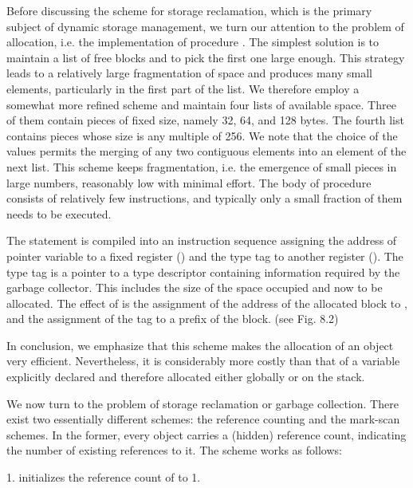 Before discussing the scheme for storage reclamation, which is the primary subject of dynamic storage management, we turn our attention to the problem of allocation, i.e. the implementation of procedure . The simplest solution is to maintain a list of free blocks and to pick the first one large enough. This strategy leads to a relatively large fragmentation of space and produces many small elements, particularly in the first part of the list. We therefore employ a somewhat more refined scheme and maintain four lists of available space. Three of them contain pieces of fixed size, namely 32, 64, and 128 bytes. The fourth list contains pieces whose size is any multiple of 256. We note that the choice of the values permits the merging of any two contiguous elements into an element of the next list. This scheme keeps fragmentation, i.e. the emergence of small pieces in large numbers, reasonably low with minimal effort. The body of procedure  consists of relatively few instructions, and typically only a small fraction of them needs to be executed.

The statement  is compiled into an instruction sequence assigning the address of pointer variable  to a fixed register () and the type tag to another register (). The type tag is a pointer to a type descriptor containing information required by the garbage collector. This includes the size of the space occupied and now to be allocated. The effect of  is the assignment of the address of the allocated block to , and the assignment of the tag to a prefix of the block. (see Fig. 8.2)


In conclusion, we emphasize that this scheme makes the allocation of an object very efficient. Nevertheless, it is considerably more costly than that of a variable explicitly declared and therefore allocated either globally or on the stack.

We now turn to the problem of storage reclamation or garbage collection. There exist two essentially different schemes: the reference counting and the mark-scan schemes. In the former, every object carries a (hidden) reference count, indicating the number of existing references to it. The scheme works as follows:

1.  initializes the reference count of  to 1.

